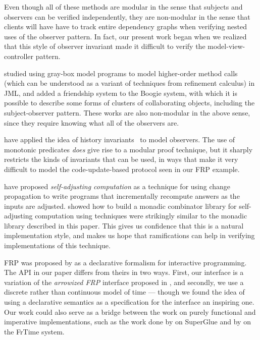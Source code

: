 \documentclass[natbib]{sigplanconf}
\begin{document}
Even though all of these methods are modular in the sense that
subjects and observers can be verified independently, they are
non-modular in the sense that clients will have have to track entire
dependency graphs when verifying nested uses of the observer
pattern. In fact, our present work began when we realized that this
style of observer invariant made it difficult to verify the
model-view-controller pattern.

\citet{shaner-leavens-naumann} studied using gray-box model programs
to model higher-order method calls (which can be understood as a
variant of techniques from refinement calculus) in JML, and
\citet{barnett-naumann} added a friendship system to the Boogie
system, with which it is possible to describe some forms of clusters of
collaborating objects, including the subject-observer pattern. 
These works are also
non-modular in the above sense, since they require 
knowing what all of the observers are.


\citet{history-invariants} have applied the idea of
history invariants~\cite{liskov-wing} to model observers. The use of
monotonic predicates \emph{does} give rise to a modular
proof technique, but it sharply restricts the kinds of invariants that
can be used, in ways that make it very difficult to model the
code-update-based protocol seen in our FRP example. 

\citet{self-adjusting} have proposed \emph{self-adjusting computation}
as a technique for using change propagation to write programs that
incrementally recompute answers as the inputs are
adjusted. \citet{carlsson} showed how to build a monadic combinator library for
self-adjusting computation using techniques were strikingly similar
to the monadic library described in this paper. This gives us 
confidence that this is a natural implementation style, and makes us 
hope that ramifications can help in verifying implementations of this
technique.

FRP was proposed by \citet{frp} as a declarative formalism for
interactive programming. The API in our paper differs from theirs in
two ways. First, our interface is a variation of the \emph{arrowized
  FRP} interface proposed in \citet{afrp}, and secondly, we use a
discrete rather than continuous model of time --- though we found the
idea of using a declarative semantics as a specification for the
interface an inspiring one.  Our work could also serve as a bridge
between the work on purely functional and imperative implementations,
such as the work done by \citet{superglue} on SuperGlue and by
\citet{frtime} on the FrTime system.
\end{document}
